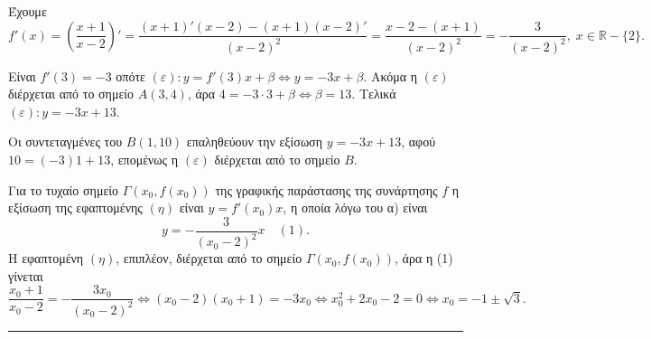 \begin{alist}
    \item Έχουμε
    \[ f'(x) = \left(\frac{x+1}{x-2}\right)' = \frac{(x+1)'(x-2)-(x+1)(x-2)'}{(x-2)^2} = \frac{x-2-(x+1)}{(x-2)^2} = -\frac{3}{(x-2)^2}, \; x \in \mathbb{R}-\{2\}. \]

    \item
    \begin{rlist}
        \item Είναι $f'(3)=-3$ οπότε $(\varepsilon): y=f'(3)x+\beta \Leftrightarrow y=-3x+\beta$. Ακόμα η $(\varepsilon)$ διέρχεται από το σημείο $A(3,4)$, άρα $4=-3 \cdot 3 + \beta \Leftrightarrow \beta = 13$. Τελικά $(\varepsilon): y=-3x+13$.
        
        \item Οι συντεταγμένες του $B(1,10)$ επαληθεύουν την εξίσωση $y=-3x+13$, αφού $10=(-3)1+13$, επομένως η $(\varepsilon)$ διέρχεται από το σημείο $B$.
    \end{rlist}
    
    \item Για το τυχαίο σημείο $\Gamma(x_0, f(x_0))$ της γραφικής παράστασης της συνάρτησης $f$ η εξίσωση της εφαπτομένης $(\eta)$ είναι $y=f'(x_0)x$, η οποία λόγω του α) είναι
    \[ y = -\frac{3}{(x_0-2)^2}x \quad (1). \]
    Η εφαπτομένη $(\eta)$, επιπλέον, διέρχεται από το σημείο $\Gamma(x_0, f(x_0))$, άρα η (1) γίνεται
    \[ \frac{x_0+1}{x_0-2} = -\frac{3x_0}{(x_0-2)^2} \Leftrightarrow (x_0-2)(x_0+1) = -3x_0 \Leftrightarrow x_0^2+2x_0-2=0 \Leftrightarrow x_0 = -1 \pm \sqrt{3}. \]
\end{alist}
\vspace{6mm}
\noindent\rule{\textwidth}{0.4pt}
\vspace{6mm}

